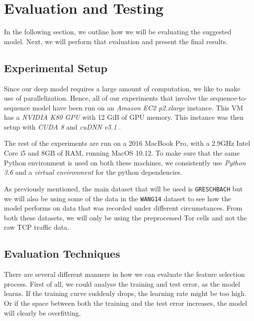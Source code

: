 

\chapter{Evaluation and Testing}

In the following section, we outline how we will be evaluating the suggested model.
Next, we will perform that evaluation and present the final results.

\section{Experimental Setup}

Since our deep model requires a large amount of computation, we like to make use of parallelization.
Hence, all of our experiments that involve the sequence-to-sequence model have been run on an \textit{Amazon EC2 p2.xlarge} instance.
This VM has a \textit{NVIDIA K80 GPU} with 12 GiB of GPU memory.
This instance was then setup with \textit{CUDA 8} and \textit{cuDNN v5.1} \cite{tensorflow,nvidia_developer_2017}.

The rest of the experiments are run on a 2016 MacBook Pro, with a 2.9GHz Intel Core i5 and 8GB of RAM, running MacOS 10.12.
To make sure that the same Python environment is used on both these machines, we consistently use \textit{Python 3.6} and a \textit{virtual environment} for the python dependencies.

As previously mentioned, the main dataset that will be used is \texttt{GRESCHBACH} but we will also be using some of the data in the \texttt{WANG14} dataset to see how the model performs on data that was recorded under different circumstances.
From both these datasets, we will only be using the preprocessed Tor cells and not the raw TCP traffic data.


\section{Evaluation Techniques}

There are several different manners in how we can evaluate the feature selection process.
First of all, we could analyse the training and test error, as the model learns.
If the training curve suddenly drops, the learning rate might be too high.
Or if the space between both the training and the test error increases, the model will clearly be overfitting.

